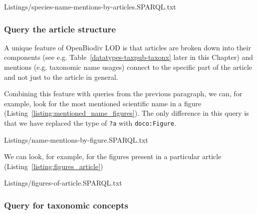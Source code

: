 






{Listings/species-name-mentions-by-articles.SPARQL.txt}

\subsubsection{Query the article structure} A unique feature of OpenBiodiv LOD is that articles are broken down into their components (see e.g. Table~\ref{datatypes-taxpub-taxonx} later in this Chapter) and mentions (e.g. taxonomic name usages) connect to the specific part of the article and not just to the article in general.

Combining this feature with queries from the previous paragraph, we can, for example, look for the most mentioned scientific name in a figure (Listing~\ref{listing:mentioned_name_figures}). The only difference in this query is that we have replaced the type of {\tt ?a} with {\tt doco:Figure}. 


{Listings/name-mentions-by-figure.SPARQL.txt}

We can look, for example, for the figures present in a particular article (Listing~\ref{listing:figures_article})


{Listings/figures-of-article.SPARQL.txt}

\subsubsection{Query for taxonomic concepts}


